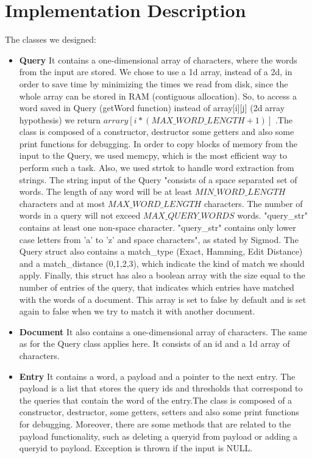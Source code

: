 \documentclass{article}
\begin{document}
\section{Implementation Description}
The classes we designed:
\begin{itemize}
  \item \textbf{Query}
  It contains a one-dimensional array of characters, where the words from the input are stored. We chose to use a 1d array, instead of a 2d, in order to save time by minimizing the times we read from disk, since the whole array can be stored in RAM (contiguous allocation). So, to access a word saved in Query (getWord function) instead of array[i][j] (2d array hypothesis) we return $arrary[i*(MAX\_WORD\_LENGTH + 1)]$ .The class is composed of a constructor, destructor some getters and also some print functions for debugging. In order to copy blocks of memory from the input to the Query, we used memcpy, which is the most efficient way to perform such a task. Also, we used strtok to handle word extraction from strings.  The string input of the Query "consists of a space separated set of words. The length of any word will be at least $MIN\_WORD\_LENGTH$ characters and at most $MAX\_WORD\_LENGTH$ characters. The number of words in a query will not exceed $MAX\_QUERY\_WORDS$ words. "query\_str" contains at least one non-space character. "query\_str" contains only lower case letters from 'a' to 'z' and space characters", as stated by Sigmod. The Query struct also contains a match\_type (Exact, Hamming, Edit Distance) and a match\_distance (0,1,2,3), which indicate the kind of match we should apply. Finally, this struct has also a boolean array with the size equal to the number of entries of the query, that indicates which entries have matched with the words of a document. This array is set to false by default and is set again to false when we try to match it with another document.
  \item \textbf{Document} 
  It also contains a one-dimensional array of characters. The same as for the Query class applies here. It consists of an id and a 1d array of characters.
  \item \textbf{Entry}
  It contains a word, a payload and a pointer to the next entry. The payload is a list that stores the query ids and thresholds that correspond to the queries that contain the word of the entry.The class is composed of a constructor, destructor, some getters, setters and also some print functions for debugging. Moreover, there are some methods that are related to the payload functionality, such as deleting a queryid from payload or adding a queryid to payload. Exception is thrown if the input is NULL.

\end{itemize}
\end{document}
